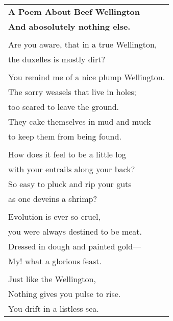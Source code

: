 \documentclass{article}
\begin{document}
\newcommand{\h}{\hspace*{4ex}}

%
%
%
%

\begin{center}
\begin{longtable}{l}
\textbf{A Poem About Beef Wellington} \\
{\small\textbf{And abosolutely nothing else.}} \\
\\
Are you aware, that in a true Wellington, \\
the duxelles is mostly dirt? \\
\\
You remind me of a nice plump Wellington. \\
The sorry weasels that live in holes; \\
too scared to leave the ground. \\
They cake themselves in mud and muck \\
to keep them from being found. \\
\\
How does it feel to be a little log \\
with your entrails along your back? \\
So easy to pluck and rip your guts \\
as one deveins a shrimp? \\
\\
Evolution is ever so cruel, \\
you were always destined to be meat. \\
Dressed in dough and painted gold--- \\
My! what a glorious feast. \\
\\
Just like the Wellington, \\
Nothing gives you pulse to rise. \\
You drift in a listless sea. \\

\end{longtable}
\end{center}
\end{document}
